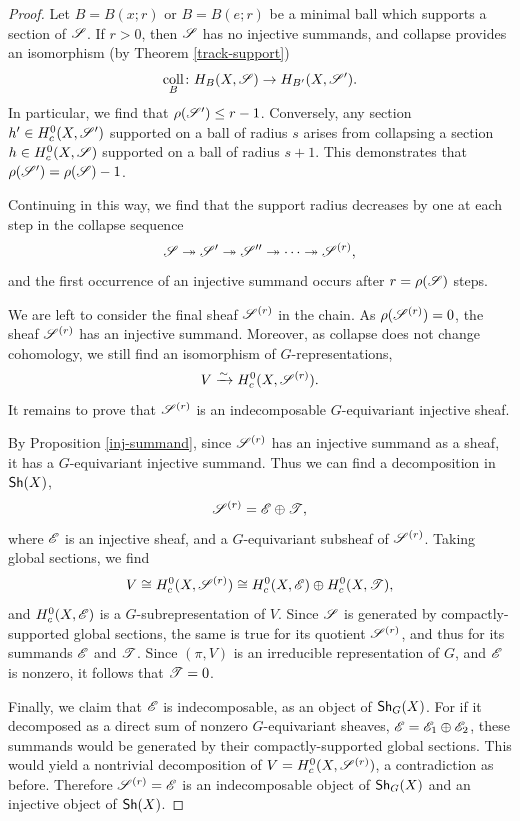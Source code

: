 \documentclass[letter]{amsart}
\theoremstyle{definition}
\theoremstyle{remark}
\numberwithin{thm}{section}
\numberwithin{equation}{section}
\DeclareMathOperator{\coll}{coll}
\begin{document}
\begin{proof}
Let $B = B(x;r)$ or $B = B(e;r)$ be a minimal ball which supports a section of ${\mathscr{S}}$.  If $r > 0$, then ${\mathscr{S}}$ has no injective summands, and collapse provides an isomorphism (by Theorem \ref{track-support})
$$\coll_B \From H_B(X, \sheaf{S}) \To H_{B'}(X, \sheaf{S}').$$
In particular, we find that $\rho({\mathscr{S}}') \leq r - 1$.  Conversely, any section $h' \in H_c^0(X, {\mathscr{S}}')$ supported on a ball of radius $s$ arises from collapsing a section $h \in H_c^0(X, {\mathscr{S}})$ supported on a ball of radius $s+1$.  This demonstrates that $\rho({\mathscr{S}}') = \rho({\mathscr{S}}) - 1$.  

Continuing in this way, we find that the support radius decreases by one at each step in the collapse sequence
$${\mathscr{S}} \twoheadrightarrow {\mathscr{S}}' \twoheadrightarrow {\mathscr{S}}'' \twoheadrightarrow \cdots \twoheadrightarrow {\mathscr{S}}^{(r)},$$
and the first occurrence of an injective summand occurs after $r = \rho({\mathscr{S}})$ steps.  

We are left to consider the final sheaf ${\mathscr{S}}^{(r)}$ in the chain.  As $\rho({\mathscr{S}}^{(r)}) = 0$, the sheaf ${\mathscr{S}}^{(r)}$ has an injective summand.  Moreover, as collapse does not change cohomology, we still find an isomorphism of $G$-representations,
$$V \xrightarrow{\sim} H_c^0(X, {\mathscr{S}}^{(r)}).$$
It remains to prove that ${\mathscr{S}}^{(r)}$ is an indecomposable $G$-equivariant injective sheaf.  

By Proposition \ref{inj-summand}, since ${\mathscr{S}}^{(r)}$ has an injective summand as a sheaf, it has a $G$-equivariant injective summand.  Thus we can find a decomposition in ${\mathsf{Sh}}(X)$,
$${\mathscr{S}}^{(r)} = {\mathscr{E}} \oplus {\mathscr{T}},$$
where ${\mathscr{E}}$ is an injective sheaf, and a $G$-equivariant subsheaf of ${\mathscr{S}}^{(r)}$.  Taking global sections, we find
$$V \cong H_c^0(X, {\mathscr{S}}^{(r)}) \cong H_c^0(X, {\mathscr{E}}) \oplus H_c^0(X, {\mathscr{T}}),$$
and $H_c^0(X, {\mathscr{E}})$ is a $G$-subrepresentation of $V$.  Since ${\mathscr{S}}$ is generated by compactly-supported global sections, the same is true for its quotient ${\mathscr{S}}^{(r)}$, and thus for its summands ${\mathscr{E}}$ and ${\mathscr{T}}$.  Since $(\pi, V)$ is an irreducible representation of $G$, and ${\mathscr{E}}$ is nonzero, it follows that ${\mathscr{T}} = 0$.

Finally, we claim that ${\mathscr{E}}$ is indecomposable, as an object of ${\mathsf{Sh}}_G(X)$.  For if it decomposed as a direct sum of nonzero $G$-equivariant sheaves, ${\mathscr{E}} = {\mathscr{E}}_1 \oplus {\mathscr{E}}_2$, these summands would be generated by their compactly-supported global sections.  This would yield a nontrivial decomposition of $V = H_c^0(X, {\mathscr{S}}^{(r)})$, a contradiction as before.  Therefore ${\mathscr{S}}^{(r)} = {\mathscr{E}}$ is an indecomposable object of ${\mathsf{Sh}}_G(X)$ and an injective object of ${\mathsf{Sh}}(X)$. 
\end{proof}
\end{document}
